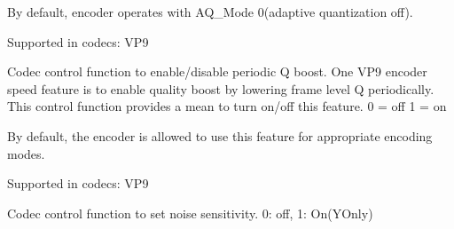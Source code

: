 \begin{Desc}
\begin{description}
By default, encoder operates with A\+Q\+\_\+\+Mode 0(adaptive quantization off).

Supported in codecs\+: V\+P9 \item[{\em 
V\+P9\+E\+\_\+\+S\+E\+T\+\_\+\+F\+R\+A\+M\+E\+\_\+\+P\+E\+R\+I\+O\+D\+I\+C\+\_\+\+B\+O\+O\+ST\hypertarget{group__vp8__encoder_gga6deae3d561c838952552c3d3756322eca064d768f60d2d60a07c160174c3df266}{}\label{group__vp8__encoder_gga6deae3d561c838952552c3d3756322eca064d768f60d2d60a07c160174c3df266}
}]Codec control function to enable/disable periodic Q boost. One V\+P9 encoder speed feature is to enable quality boost by lowering frame level Q periodically. This control function provides a mean to turn on/off this feature. 0 = off 1 = on

By default, the encoder is allowed to use this feature for appropriate encoding modes.

Supported in codecs\+: V\+P9 \item[{\em 
V\+P9\+E\+\_\+\+S\+E\+T\+\_\+\+N\+O\+I\+S\+E\+\_\+\+S\+E\+N\+S\+I\+T\+I\+V\+I\+TY\hypertarget{group__vp8__encoder_gga6deae3d561c838952552c3d3756322ecace6096a9fbe83dc72ed6a54a81ce215b}{}\label{group__vp8__encoder_gga6deae3d561c838952552c3d3756322ecace6096a9fbe83dc72ed6a54a81ce215b}
}]Codec control function to set noise sensitivity. 0\+: off, 1\+: On(\+Y\+Only)


\end{description}
\end{Desc}
